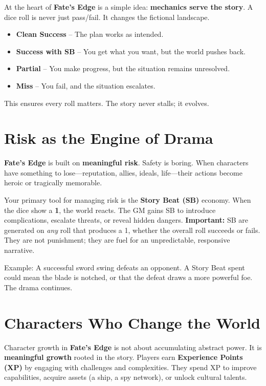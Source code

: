 At the heart of \textbf{Fate's Edge} is a simple idea: \textbf{mechanics serve the story}. A dice roll is never just pass/fail. It changes the fictional landscape.

\begin{itemize}
    \item \textbf{Clean Success} – The plan works as intended.
    \item \textbf{Success with SB} – You get what you want, but the world pushes back.
    \item \textbf{Partial} – You make progress, but the situation remains unresolved.
    \item \textbf{Miss} – You fail, and the situation escalates.
\end{itemize}

This ensures every roll matters. The story never stalls; it evolves.

\section{Risk as the Engine of Drama}
\label{sec:gm-risk-drama}

\textbf{Fate's Edge} is built on \textbf{meaningful risk}. Safety is boring. When characters have something to lose—reputation, allies, ideals, life—their actions become heroic or tragically memorable.

Your primary tool for managing risk is the \textbf{Story Beat (SB)} economy. When the dice show a \textbf{1}, the world reacts. The GM gains SB to introduce complications, escalate threats, or reveal hidden dangers. \textbf{Important:} SB are generated on \emph{any} roll that produces a 1, whether the overall roll succeeds or fails. They are not punishment; they are fuel for an unpredictable, responsive narrative.

Example: A successful sword swing defeats an opponent. A Story Beat spent could mean the blade is notched, or that the defeat draws a more powerful foe. The drama continues.

\section{Characters Who Change the World}
\label{sec:gm-growth}

Character growth in \textbf{Fate's Edge} is not about accumulating abstract power. It is \textbf{meaningful growth} rooted in the story. Players earn \textbf{Experience Points (XP)} by engaging with challenges and complexities. They spend XP to improve capabilities, acquire assets (a ship, a spy network), or unlock cultural talents.

